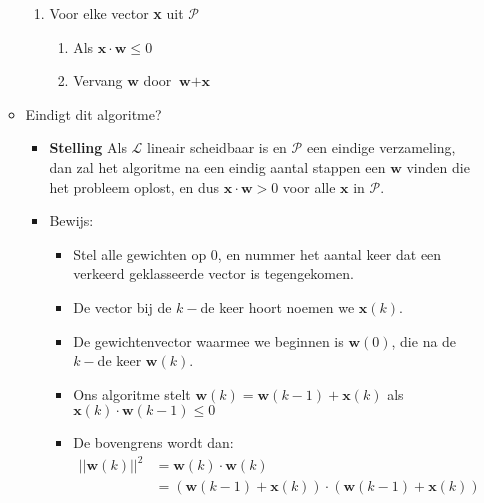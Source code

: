\begin{itemize}
\begin{itemize}
\begin{enumerate}
                \item Voor elke vector \textbf{x} uit $\mathcal{P}$
                \begin{enumerate}
                    \item Als $\textbf{x} \cdot \textbf{w} \leq 0$
                    \item Vervang $\textbf{w}$ door $\textbf{w} + \textbf{x}$
                \end{enumerate}       
        \end{enumerate}
        \item Eindigt dit algoritme?
        \begin{itemize}
            \alert Als we $\textbf{w}$ vervangen door $\textbf{w + x}$ kan het zijn dat $\textbf{x} \cdot (\textbf{w + x})$ nog altijd negatief is.
            \alert Het kan zijn dat een vector $\textbf{v}$ uit $\mathcal{P}$, die al correct geklasseerd was, $\textbf{v \cdot x} > 0$ ,nu verkeerd wordt geklasseerd. Het zou kunnen dat $\textbf{x \cdot v} < 0$ en dan is $\textbf{v} \cdot (\textbf{w + x}) < \textbf{v \cdot w}$.
            \item \textbf{Stelling} Als $\mathcal{L}$ lineair scheidbaar is en $\mathcal{P}$ een eindige verzameling, dan zal het algoritme na een eindig aantal stappen een $\textbf{w}$ vinden die het probleem oplost, en dus $\textbf{x} \cdot \textbf{w} > 0$ voor alle $\textbf{x}$ in $\mathcal{P}$.
            \item Bewijs:
            \begin{itemize}
                \item Stel alle gewichten op 0, en nummer het aantal keer dat een verkeerd geklasseerde vector is tegengekomen.
                \item De vector bij de $k-$de keer hoort noemen we $\textbf{x}(k)$.
                \item De gewichtenvector waarmee we beginnen is $\textbf{w}(0)$, die na de $k-$de keer $\textbf{w}(k)$.
                \item Ons algoritme stelt $\textbf{w}(k) = \textbf{w}(k - 1) + \textbf{x}(k)$ als $\textbf{x}(k) \cdot \textbf{w}(k - 1) \leq 0$
                \item De bovengrens wordt dan:
                \begin{align*}
                    ||\textbf{w}(k)||^2 & = \textbf{w}(k) \cdot \textbf{w}(k) \\
                                        & = (\textbf{w}(k - 1) + \textbf{x}(k)) \cdot (\textbf{w}(k - 1) + \textbf{x}(k)) \\

\end{align*}
\end{itemize}
\end{itemize}
\end{itemize}
\end{itemize}
